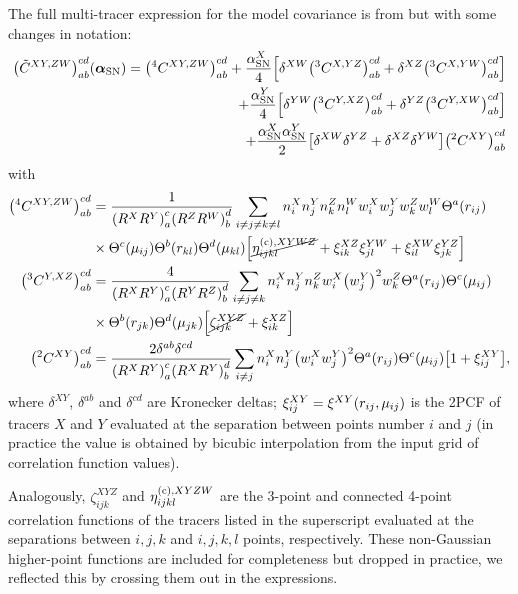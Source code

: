 The full multi-tracer expression for the model covariance is from \cite{rascalC} but with some changes in notation:
\begin{align} \label{eq:Cov2x2estimator-multi}
\qty(\tilde C^{XY,ZW})_{ab}^{cd} \qty(\bm \alpha_{\rm SN}) = \qty(^4C^{XY,ZW})_{ab}^{cd} + \frac{\alpha_{\rm SN}^X}4 \qty[\delta^{XW} \qty(^3C^{X,YZ})_{ab}^{cd} + \delta^{XZ} \qty(^3C^{X,YW})_{ab}^{cd}] \\ \nonumber
+ \frac{\alpha_{\rm SN}^Y}4 \qty[\delta^{YW} \qty(^3C^{Y,XZ})_{ab}^{cd} + \delta^{YZ} \qty(^3C^{Y,XW})_{ab}^{cd}] \\ \nonumber
+ \frac{\alpha_{\rm SN}^X \alpha_{\rm SN}^Y}2 \qty[\delta^{XW} \delta^{YZ} + \delta^{XZ} \delta^{YW}] \qty(^2C^{XY})_{ab}^{cd}
\end{align}
with
\begin{align} \label{eq:Cov2x2_234_Point_Defs-multi}
\qty(^4C^{XY,ZW})_{ab}^{cd} &= \frac{1}{\qty(R^XR^Y)_a^c \qty(R^ZR^W)_b^d} \sum_{i\neq j\neq k\neq l} n^X_i n^Y_j n^Z_k n^W_l w^X_i w^Y_j w^Z_k w^W_l \Theta^a(r_{ij}) \\ \nonumber
& \times \Theta^c(\mu_{ij}) \Theta^b(r_{kl}) \Theta^d(\mu_{kl}) \qty[\cancel{\eta^{({\rm c}),XYWZ}_{ijkl}} + \xi^{XZ}_{ik} \xi^{YW}_{jl} + \xi^{XW}_{il} \xi^{YZ}_{jk}] \\ \nonumber
\qty(^3C^{Y,XZ})_{ab}^{cd} &= \frac{4}{\qty(R^XR^Y)_a^c \qty(R^YR^Z)_b^d} \sum_{i\neq j\neq k} n^X_i n^Y_j n^Z_k w^X_i \qty(w^Y_j)^2 w^Z_k \Theta^a(r_{ij}) \Theta^c(\mu_{ij}) \\ \nonumber
& \times \Theta^b(r_{jk}) \Theta^d(\mu_{jk}) \qty[\cancel{\zeta^{XYZ}_{ijk}} + \xi^{XZ}_{ik}] \\ \nonumber
\qty(^2C^{XY})_{ab}^{cd} &= \frac{2\delta^{ab}\delta^{cd}}{\qty(R^XR^Y)_a^c \qty(R^XR^Y)_b^d}\sum_{i\neq j} n^X_i n^Y_j \qty(w^X_i w^Y_j)^2 \Theta^a(r_{ij}) \Theta^c(\mu_{ij}) \qty[1+\xi^{XY}_{ij}],
\end{align}
where $\delta^{XY}$, $\delta^{ab}$ and $\delta^{cd}$ are Kronecker deltas; $\xi^{XY}_{ij} = \xi^{XY}\qty(r_{ij}, \mu_{ij})$ is the 2PCF of tracers $X$ and $Y$ evaluated at the separation between points number $i$ and $j$ (in practice the value is obtained by bicubic interpolation from the input grid of correlation function values).

Analogously, $\zeta^{XYZ}_{ijk}$ and $\eta^{{(\rm c)},XYZW}_{ijkl}$ are the 3-point and connected 4-point correlation functions of the tracers listed in the superscript evaluated at the separations between $i,j,k$ and $i,j,k,l$ points, respectively.
These non-Gaussian higher-point functions are included for completeness but dropped in practice, we reflected this by crossing them out in the expressions.

